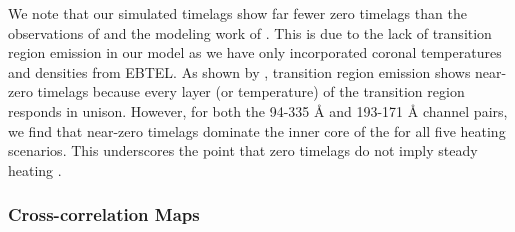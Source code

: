 We note that our simulated timelags show far fewer zero timelags than the observations of \citet{viall_evidence_2012,viall_survey_2017} and the modeling work of \citet{bradshaw_patterns_2016}. This is due to the lack of transition region emission in our model as we have only incorporated coronal temperatures and densities from EBTEL. As shown by \citet{viall_transition_2015}, transition region emission shows near-zero timelags because every layer (or temperature) of the transition region responds in unison. However, for both the 94-335 \AA{} and 193-171 \AA{} channel pairs, we find that near-zero timelags dominate the inner core of the \AR{} for all five heating scenarios. This underscores the point that zero timelags do not imply steady heating \citep[see][]{viall_transition_2015,viall_signatures_2016}.

\subsubsection{Cross-correlation Maps}\label{correlation_maps}

